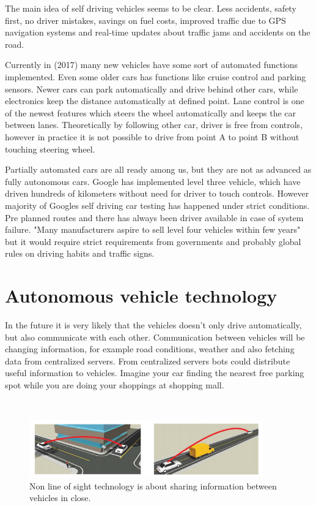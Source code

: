 \documentclass[english]{tktltiki}
\begin{document}
The main idea of self driving vehicles seems to be clear. Less accidents, safety 
first, no driver mistakes, savings on fuel costs, improved traffic due to GPS 
navigation systems and real-time updates about traffic jams and accidents on the 
road.

Currently in (2017) many new vehicles have some sort of automated functions 
implemented. Even some older cars has functions like cruise control and parking 
sensors. Newer cars can park automatically and drive behind other cars, while 
electronics keep the distance automatically at defined point. Lane control is 
one of the newest features which steers the wheel automatically and keeps the 
car between lanes. Theoretically by following other car, driver is free from 
controls, however in practice it is not possible to drive from point A to point 
B without touching steering wheel.

Partially automated cars are all ready among us, but they are not as advanced as 
fully autonomous cars. Google has implemented level three vehicle, which have 
driven hundreds of kilometers without need for driver to touch controls. However 
majority of Googles self driving car testing has happened under strict 
conditions. Pre planned routes and there has always been driver available in 
case of system failure. \cite{transportpolicy} "Many manufacturers aspire to 
sell level four vehicles within few years" \cite{transportpolicy} but it would 
require strict requirements from governments and probably global rules on 
driving habits and traffic signs.   


\section{Autonomous vehicle technology}

In the future it is very likely that the vehicles doesn't only drive 
automatically, but also communicate with each other. \cite{trafficmodels} 
Communication between vehicles will be changing information, for example road 
conditions, weather and also fetching data from centralized servers. From 
centralized servers bots could distribute useful information to vehicles. 
Imagine your car finding the nearest free parking spot while you are doing your 
shoppings at shopping mall. 

\begin{figure}[h]
\ \newline
\begin{center}
\includegraphics[width=0.9\textwidth]{nonlineofsight.png}
\caption{Non line of sight technology is about sharing information between vehicles in close. 
\cite{connectedvehicle}}
\label{non line of sight}
\end{center}
\end{figure}
\end{document}
